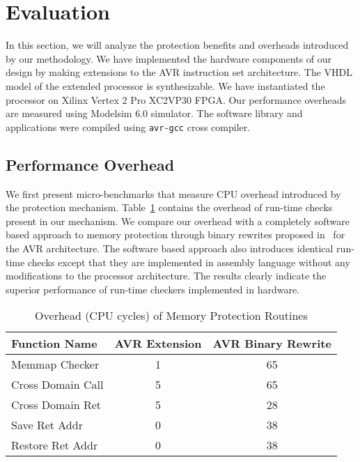 \section{Evaluation}
\label{sec:eval}
In this section, we will analyze the protection benefits and overheads introduced by our methodology.
%
We have implemented the hardware components of our design by making extensions to the AVR instruction set architecture.
%
The VHDL model of the extended processor is synthesizable.
%
We have instantiated the processor on Xilinx Vertex 2 Pro XC2VP30 FPGA.
%
Our performance overheads are measured using Modelsim 6.0 simulator.
%
The software library and applications were compiled using \texttt{avr-gcc} cross compiler.
%
%
\subsection{Performance Overhead}
%
We first present micro-benchmarks that measure CPU overhead introduced by the protection mechanism.
%
Table~\ref{tab:microbmperf} contains the overhead of run-time checks present in our mechanism.
%
We compare our overhead with a completely software based approach to memory protection through binary rewrites proposed in~\cite{ram06emnets} for the AVR architecture.
%
The software based approach also introduces identical run-time checks except that they are implemented in assembly language without any modifications to the processor architecture.
%
The results clearly indicate the superior performance of run-time checkers implemented in hardware.
%
\begin{table}[htdp]
\centering
\small{
\begin{tabular}{|l|c|c|}
	\hline
	Function Name & AVR Extension & AVR Binary Rewrite\\
	\hline
	Memmap Checker & 1 & 65\\
	Cross Domain Call & 5 & 65\\
	Cross Domain Ret & 5 & 28\\
	Save Ret Addr & 0 & 38\\
	Restore Ret Addr & 0 & 38\\
	\hline
\end{tabular}}
\caption{Overhead (CPU cycles) of Memory Protection Routines}
\label{tab:microbmperf}
\end{table}
%

